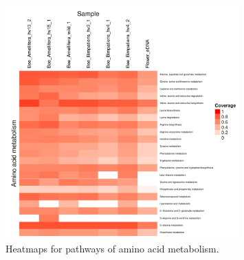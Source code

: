 \documentclass[11pt]{article}
\begin{document}
      \begin{figure}[H]
        \centering
        \includegraphics[width=0.8\textwidth]{../Figures/PathwayCov_AminoAcid.pdf}
        \caption{Heatmaps for pathways of amino acid metabolism.}
        \label{AminoAcid}
        \end{figure}
\end{document}
